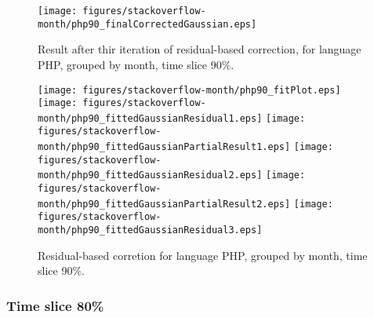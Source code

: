 \begin{figure}[]
\centering
{\texttt{[image: figures/stackoverflow-month/php90\_finalCorrectedGaussian.eps]}}
\caption{Result after thir iteration of residual-based correction, for language PHP, grouped by month, time slice 90\%.}
\end{figure}


\begin{figure}[hb]
\centering
{}
{\texttt{[image: figures/stackoverflow-month/php90\_fitPlot.eps]}}
{\texttt{[image: figures/stackoverflow-month/php90\_fittedGaussianResidual1.eps]}}
{\texttt{[image: figures/stackoverflow-month/php90\_fittedGaussianPartialResult1.eps]}}
{\texttt{[image: figures/stackoverflow-month/php90\_fittedGaussianResidual2.eps]}}
{\texttt{[image: figures/stackoverflow-month/php90\_fittedGaussianPartialResult2.eps]}}
{\texttt{[image: figures/stackoverflow-month/php90\_fittedGaussianResidual3.eps]}}
\caption{Residual-based corretion for language PHP, grouped by month, time slice 90\%.}
\end{figure}


\clearpage 
\newpage 


\FloatBarrier

\subsubsection{Time slice 80\%}

